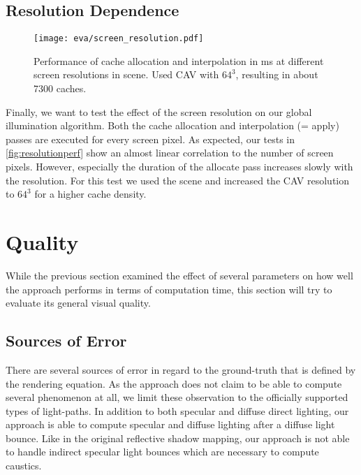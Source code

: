 \documentclass[thesis.tex]{subfiles}
\begin{document}
\subsection{Resolution Dependence}
\begin{figure}[h]
\centering
\texttt{[image: eva/screen\_resolution.pdf]}
\caption{Performance of cache allocation and interpolation in \si{\milli\second} at different screen resolutions in  scene. Used CAV with $64^3$, resulting in about 7300 caches.}
\label{fig:resolutionperf}
\end{figure}
Finally, we want to test the effect of the screen resolution on our global illumination algorithm.
Both the cache allocation and interpolation (= apply) passes are executed for every screen pixel.
As expected, our tests in \autoref{fig:resolutionperf} show an almost linear correlation to the number of screen pixels.
However, especially the duration of the allocate pass increases slowly with the resolution.
For this test we used the  scene and increased the CAV resolution to $64^3$ for a higher cache density.

\newpage


\section{Quality}
While the previous section examined the effect of several parameters on how well the approach performs in terms of computation time, this section will try to evaluate its general visual quality.

\subsection{Sources of Error} \label{sec:eva:errorsources}
There are several sources of error in regard to the ground-truth that is defined by the rendering equation.
As the approach does not claim to be able to compute several phenomenon at all, we limit these observation to the officially supported types of light-paths.
In addition to both specular and diffuse direct lighting, our approach is able to compute specular and diffuse lighting after a diffuse light bounce.
Like in the original reflective shadow mapping, our approach is not able to handle indirect specular light bounces which are necessary to compute caustics.
\end{document}
